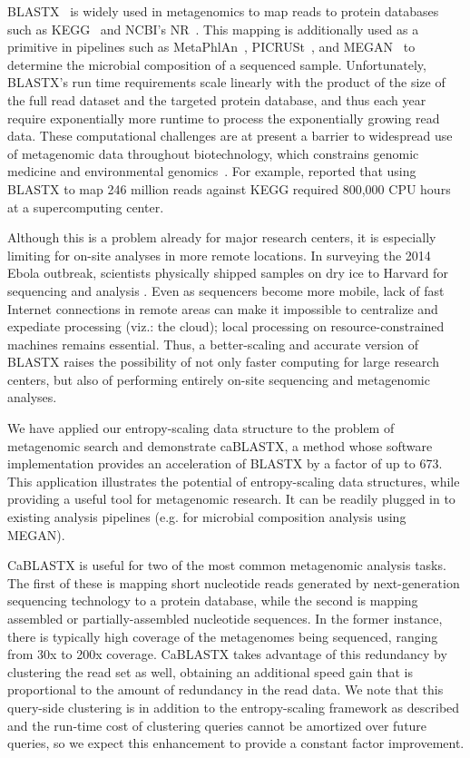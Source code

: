 \documentclass[review,preprint,12pt]{elsarticle}
\renewcommand{\cite}{\citep} %
\theoremstyle{definition}
\theoremstyle{remark}
\numberwithin{equation}{section}
\begin{document}
BLASTX~\cite{altschul1990basic} is widely used in metagenomics to map
reads to protein databases such as KEGG~\cite{kanehisa2000kegg} and NCBI's 
NR~\cite{sayers2011database}.
This mapping is additionally used as a primitive in pipelines such as MetaPhlAn~\cite{segata2012metagenomic}, 
PICRUSt~\cite{langille2013predictive}, and MEGAN~\cite{huson2011integrative} to
determine the microbial composition of a sequenced sample.
Unfortunately, BLASTX's run time requirements scale linearly with the product 
of the size of the full read dataset and the targeted protein database, and 
thus each year require exponentially more runtime to process the exponentially 
growing read data. 
These computational challenges are at present a barrier to widespread use of 
metagenomic data throughout biotechnology, which constrains genomic medicine 
and environmental genomics~\cite{frank2008gastrointestinal}.
For example, \citet{mackelprang2011metagenomic} reported that using BLASTX to map 246
million reads against KEGG required 800,000 CPU hours at a supercomputing 
center.

Although this is a problem already for major research centers, it is especially
limiting for on-site analyses in more remote locations.
In surveying the 2014 Ebola outbreak, scientists physically shipped samples on 
dry ice to Harvard for sequencing and analysis \cite{gire2014genomic}.
Even as sequencers become more mobile, lack of fast Internet connections in remote
areas can make it impossible to centralize and expediate processing (viz.: the cloud);
local processing on resource-constrained machines remains essential.
Thus, a better-scaling and accurate version of BLASTX raises the possibility of 
not only faster computing for large research centers, but also of performing
entirely on-site sequencing and metagenomic analyses.

We have applied our entropy-scaling data structure to the problem of 
metagenomic search and demonstrate caBLASTX, a method whose software 
implementation provides an acceleration of BLASTX by a factor of up 
to 673.
This application illustrates the potential of entropy-scaling data structures, while
providing a useful tool for metagenomic research.
It can be readily plugged in to existing analysis pipelines (e.g. for microbial 
composition analysis using MEGAN).

CaBLASTX is useful for two of the most common metagenomic analysis tasks. 
The first of these is mapping short nucleotide reads generated by next-generation sequencing technology to a protein database,
while the second is mapping assembled or partially-assembled
nucleotide sequences.
In the former instance, there is typically high coverage of the metagenomes
being sequenced, ranging from 30x to 200x coverage.
CaBLASTX takes advantage of this redundancy
by clustering the read set as well, obtaining an additional speed gain that is
proportional to the amount of redundancy in the read data.
We note that this query-side clustering is in addition to the entropy-scaling
framework as described and the run-time cost of clustering queries cannot
be amortized over future queries, so
we expect this enhancement to provide a 
constant factor improvement.
\end{document}
